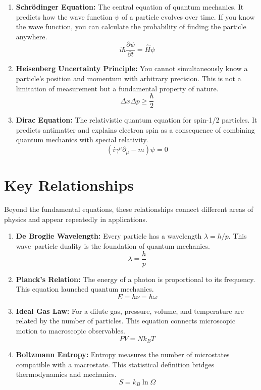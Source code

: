 \begin{enumerate}

\item \textbf{Schr\"odinger Equation:} The central equation of quantum mechanics. It predicts how the wave function $\psi$ of a particle evolves over time. If you know the wave function, you can calculate the probability of finding the particle anywhere.
\[
i\hbar \frac{\partial \psi}{\partial t} = \hat{H}\psi
\]

\item \textbf{Heisenberg Uncertainty Principle:} You cannot simultaneously know a particle's position and momentum with arbitrary precision. This is not a limitation of measurement but a fundamental property of nature.
\[
\Delta x \Delta p \geq \frac{\hbar}{2}
\]

\item \textbf{Dirac Equation:} The relativistic quantum equation for spin-1/2 particles. It predicts antimatter and explains electron spin as a consequence of combining quantum mechanics with special relativity.
\[
(i\gamma^\mu \partial_\mu - m)\psi = 0
\]

\end{enumerate}

\section*{Key Relationships}

Beyond the fundamental equations, these relationships connect different areas of physics and appear repeatedly in applications.

\begin{enumerate}

\item \textbf{De Broglie Wavelength:} Every particle has a wavelength $\lambda = h/p$. This wave--particle duality is the foundation of quantum mechanics.
\[
\lambda = \frac{h}{p}
\]

\item \textbf{Planck's Relation:} The energy of a photon is proportional to its frequency. This equation launched quantum mechanics.
\[
E = h\nu = \hbar\omega
\]

\item \textbf{Ideal Gas Law:} For a dilute gas, pressure, volume, and temperature are related by the number of particles. This equation connects microscopic motion to macroscopic observables.
\[
PV = Nk_BT
\]

\item \textbf{Boltzmann Entropy:} Entropy measures the number of microstates compatible with a macrostate. This statistical definition bridges thermodynamics and mechanics.
\[
S = k_B \ln \Omega
\]

\end{enumerate}

